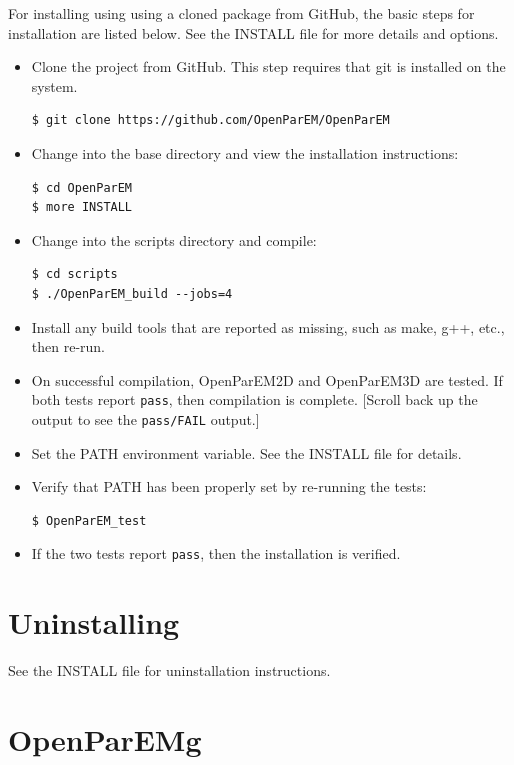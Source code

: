 \documentclass[titlepage]{article}
\renewcommand\_{\textunderscore\linebreak[1]}
\begin{document}
For installing using using a cloned package from GitHub, the basic steps for installation are listed below.  See the INSTALL file for more details and options.
\begin{itemize}[nosep]
   \item Clone the project from GitHub.  This step requires that git is installed on the system.
         \begin{Verbatim}
$ git clone https://github.com/OpenParEM/OpenParEM
         \end{Verbatim}
   \item Change into the base directory and view the installation instructions:
         \begin{Verbatim}
$ cd OpenParEM
$ more INSTALL
         \end{Verbatim}
   \item Change into the scripts directory and compile:
         \begin{Verbatim}
$ cd scripts
$ ./OpenParEM_build --jobs=4
         \end{Verbatim}
   \item Install any build tools that are reported as missing, such as make, g++, etc., then re-run.
   \item On successful compilation, OpenParEM2D and OpenParEM3D are tested.  If both tests report \texttt{pass}, then compilation is complete. [Scroll back up the output to see the \texttt{pass/FAIL} output.]
   \item Set the PATH environment variable.  See the INSTALL file for details.
   \item Verify that PATH has been properly set by re-running the tests:
         \begin{Verbatim}
$ OpenParEM_test
         \end{Verbatim}
   \item If the two tests report \texttt{pass}, then the installation is verified.
\end{itemize}

\section{Uninstalling}

See the INSTALL file for uninstallation instructions.

\section{OpenParEMg}
\end{document}
